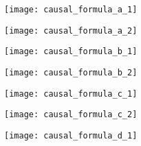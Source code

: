 \begin{figure}[htbp]
  \centering
  \begin{subfigure}{0.55\textwidth}
  	\centering
  	\begin{minipage}[b]{1\textwidth}
  	  \centering
  	  \texttt{[image: causal\_formula\_a\_1]}
  	\end{minipage}
  	\begin{minipage}[b]{1\textwidth}
  	  \vspace{1em}
  	  \centering
  	  \texttt{[image: causal\_formula\_a\_2]}
  	\end{minipage}
  	\caption{}
  	\label{fig:causal_formula_a}
  \end{subfigure}
  \begin{subfigure}{0.55\textwidth}
    \vspace{1em}
  	\centering
  	\begin{minipage}[b]{1\textwidth}
  	  \centering
  	  \texttt{[image: causal\_formula\_b\_1]}
  	\end{minipage}
  	\begin{minipage}[b]{1\textwidth}
  	  \vspace{1em}
  	  \centering
  	  \texttt{[image: causal\_formula\_b\_2]}
  	\end{minipage}
  	\caption{}
  	\label{fig:causal_formula_b}
  \end{subfigure}
  \begin{subfigure}{0.7\textwidth}
  	\vspace{1em}
  	\centering
  	\begin{minipage}[b]{1\textwidth}
  	  \centering
  	  \texttt{[image: causal\_formula\_c\_1]}
  	\end{minipage}
  	\begin{minipage}[b]{1\textwidth}
  	  \vspace{1em}
  	  \centering
  	  \texttt{[image: causal\_formula\_c\_2]}
  	\end{minipage}
  	\caption{}
  	\label{fig:causal_formula_c}
  \end{subfigure}
  \begin{subfigure}{0.85\textwidth}
  	\vspace{1em}
  	\centering
  	\begin{minipage}[b]{1\textwidth}
  	  \centering
  	  \texttt{[image: causal\_formula\_d\_1]}
  	\end{minipage}
  	\begin{minipage}[b]{1\textwidth}

\end{minipage}
\end{subfigure}
\end{figure}
